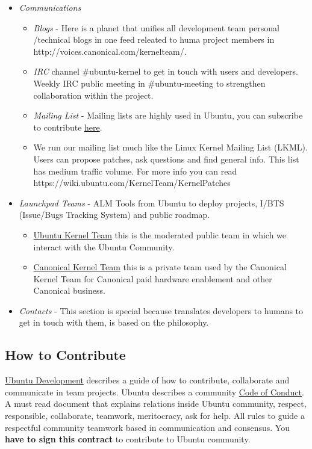 \begin{itemize}
	\item \textit{Communications}
    \begin{itemize}
	    \item \textit{Blogs} - Here is a planet that unifies all development team personal /technical blogs in one feed releated to huma project members in http://voices.canonical.com/kernelteam/.
	    \item \textit{IRC} channel \#ubuntu-kernel to get in touch with users and developers. Weekly IRC  public meeting in \#ubuntu-meeting to strengthen collaboration within the project.
	    \item \textit{Mailing List} - Mailing lists are highly used in Ubuntu, you can subscribe to contribute \href{https://lists.ubuntu.com/mailman/listinfo/kernel-team}{here}.
	    \item We run our mailing list much like the Linux Kernel Mailing List (LKML). Users can propose patches, ask questions and find general info. This list has medium traffic volume. For more info you can read https://wiki.ubuntu.com/KernelTeam/KernelPatches
    \end{itemize}
	\item \textit{Launchpad Teams} - ALM Tools from Ubuntu to deploy projects, I/BTS (Issue/Bugs Tracking System) and public roadmap.
\begin{itemize}
	\item \href{https://launchpad.net/~ubuntu-kernel-team}{Ubuntu Kernel Team} this is the moderated public team in which we interact with the Ubuntu Community.
	\item \href{https://launchpad.net/~canonical-kernel-team}{Canonical Kernel Team} this is a private team used by the Canonical Kernel Team for Canonical paid hardware enablement and other Canonical business.
\end{itemize}
	\item \textit{Contacts} - This section is special because translates developers to humans to get in touch with them, is based on the philosophy.
\end{itemize}

\subsection{How to Contribute}

\par \href{https://wiki.ubuntu.com/UbuntuDevelopment}{Ubuntu Development} describes a guide of how to contribute, collaborate and communicate in team projects. Ubuntu describes a community \href{http://www.ubuntu.com/project/about-ubuntu/conduct}{Code of Conduct}. A must read document that explains relations inside Ubuntu community, respect, responsible, collaborate, teamwork, meritocracy, ask for help. All rules to guide a respectful community teamwork based in communication and consensus. You \textbf{have to sign this contract} to contribute to Ubuntu community.

